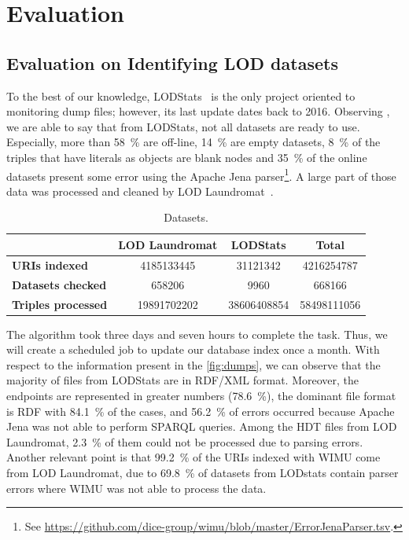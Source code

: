 \documentclass[sw]{iosart2x}
\begin{document}
\section{Evaluation}
\label{sec:eval}

\subsection{Evaluation on Identifying LOD datasets}

To the best of our knowledge, LODStats~\cite{auer2012lodstats} is the only project oriented to monitoring dump files; however, its last update dates back to 2016. 
Observing , we are able to say that from LODStats, not all datasets are ready to use.
Especially, more than \SI{58}{\percent} are off-line, \SI{14}{\percent} are empty datasets, \SI{8}{\percent} of the triples that have literals as objects are blank nodes and \SI{35}{\percent} of the online datasets present some error using the Apache Jena parser\footnote{See \url{https://github.com/dice-group/wimu/blob/master/ErrorJenaParser.tsv}.}. 
A large part of those data was processed and cleaned by LOD Laundromat~\cite{beek2014lod}.


\setlength{\tabcolsep}{0.1em} %
\begin{table}[H]
	\centering
	\caption{Datasets.}
	\label{tab:lodstats}
    \scriptsize
    \begin{tabular}{lS[table-format=11.0]S[table-format=12.0]S[table-format=12.0]} %
    \toprule
    & \textbf{LOD Laundromat} & \textbf{LODStats} & \textbf{Total} \\
    \midrule
    \textbf{URIs indexed} & 4185133445 & 31121342 & 4216254787 \\
    \textbf{Datasets checked} & 658206 & 9960 & 668166 \\
    \textbf{Triples processed} & 19891702202 & 38606408854 & 58498111056 \\
    \bottomrule
    \end{tabular}
\end{table}

The algorithm took three days and seven hours to complete the task. 
Thus, we will create a scheduled job to update our database index once a month.
With respect to the information present in the \cref{fig:dumps}, we can observe that the majority of files from LODStats are in RDF/XML format.
Moreover, the endpoints are represented in greater numbers (\SI{78.6}{\percent}), the dominant file format is RDF with \SI{84.1}{\percent} of the cases, and \SI{56.2}{\percent} of errors occurred because Apache Jena was not able to perform SPARQL queries.
Among the HDT files from LOD Laundromat, \SI{2.3}{\percent} of them could not be processed due to parsing errors.
Another relevant point is that \SI{99.2}{\percent} of the URIs indexed with WIMU come from LOD Laundromat, due to \SI{69.8}{\percent} of datasets from LODstats contain parser errors where WIMU was not able to process the data.
\end{document}
